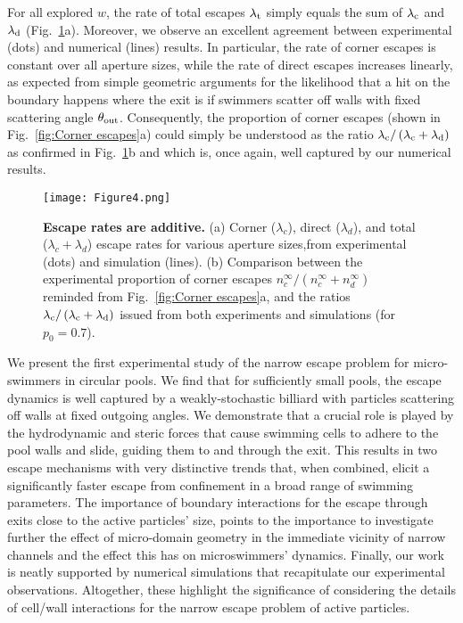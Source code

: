 \documentclass[aps,showpacs,superscriptaddress,amsfonts,twocolumn,prl]{revtex4}
\begin{document}
For all explored $w$, the rate of total escapes $\lambda_{\rm t}$ simply equals the sum of $\lambda_{\rm c}$ and $\lambda_{\rm d}$ (Fig.~\ref{fig:Rates}a). Moreover, we observe an excellent agreement between experimental (dots) and numerical (lines) results. In particular, the rate of corner escapes is constant over all aperture sizes, while the rate of direct escapes increases linearly, as expected from simple geometric arguments for the  likelihood that a hit on the boundary happens where the exit is if swimmers scatter off walls with fixed scattering angle $\theta_{\rm{ out}}$. Consequently, the proportion of corner escapes (shown in Fig.~\ref{fig:Corner escapes}a) could simply be understood as the ratio $\lambda_{\rm c}/\left(\lambda_{\rm c}+\lambda_{\rm d}\right)$ as confirmed in Fig.~\ref{fig:Rates}b and which is, once again, well captured by our numerical results.

\begin{figure}[tb]
	\texttt{[image: Figure4.png]}
	\caption{\label{fig:Rates}\textbf{Escape rates are additive.} (a) Corner ($\lambda_c$), direct ($\lambda_d$), and total ($\lambda_c+\lambda_d$) escape rates for various aperture sizes,from experimental (dots) and simulation (lines). (b) Comparison between the experimental proportion of corner escapes $n_c^\infty/(n_c^\infty+n_d^\infty)$ reminded from Fig.~\ref{fig:Corner escapes}a, and the ratios $\lambda_{\rm c}/\left(\lambda_{\rm c}+\lambda_{\rm d}\right)$ issued from both experiments and simulations (for $p_0=0.7$).}
\end{figure}

We present the first experimental study of the narrow escape problem for micro-swimmers in circular pools. We find that for sufficiently small pools, the escape dynamics is well captured by a weakly-stochastic billiard with particles scattering off walls at fixed outgoing angles. We demonstrate that a crucial role is played by the hydrodynamic and steric forces that cause swimming cells to adhere to the pool walls and slide, guiding them to and through the exit. This results in two escape mechanisms with very distinctive trends that, when combined, elicit a significantly faster escape from confinement in a broad range of swimming parameters. The importance of boundary interactions for the escape through exits close to the active particles' size, points to the importance to investigate further the effect of micro-domain geometry in the immediate vicinity of narrow channels and the effect this has on microswimmers' dynamics. Finally, our work is neatly supported by numerical simulations that recapitulate our experimental observations. Altogether, these highlight the significance of considering the details of cell/wall interactions for the narrow escape problem of active particles.
\end{document}
